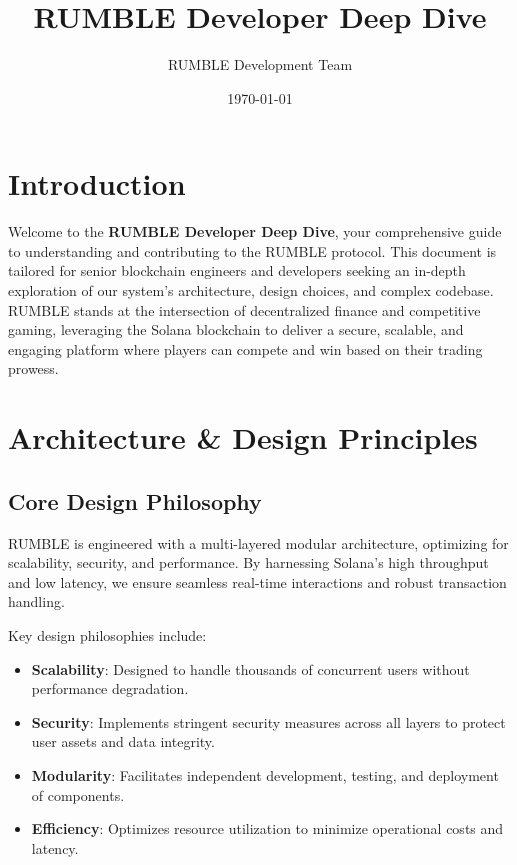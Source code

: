 \documentclass[11pt,a4paper]{article}
\title{RUMBLE Developer Deep Dive}
\author{RUMBLE Development Team}
\date{\today}
\begin{document}
\maketitle
\tableofcontents
\newpage

\section{Introduction}

Welcome to the \textbf{RUMBLE Developer Deep Dive}, your comprehensive guide to understanding and contributing to the RUMBLE protocol. This document is tailored for senior blockchain engineers and developers seeking an in-depth exploration of our system's architecture, design choices, and complex codebase. RUMBLE stands at the intersection of decentralized finance and competitive gaming, leveraging the Solana blockchain to deliver a secure, scalable, and engaging platform where players can compete and win based on their trading prowess.

\section{Architecture \& Design Principles}

\subsection{Core Design Philosophy}

RUMBLE is engineered with a multi-layered modular architecture, optimizing for scalability, security, and performance. By harnessing Solana's high throughput and low latency, we ensure seamless real-time interactions and robust transaction handling.

Key design philosophies include:

\begin{itemize}
    \item \textbf{Scalability}: Designed to handle thousands of concurrent users without performance degradation.
    \item \textbf{Security}: Implements stringent security measures across all layers to protect user assets and data integrity.
    \item \textbf{Modularity}: Facilitates independent development, testing, and deployment of components.
    \item \textbf{Efficiency}: Optimizes resource utilization to minimize operational costs and latency.
\end{itemize}
\end{document}
